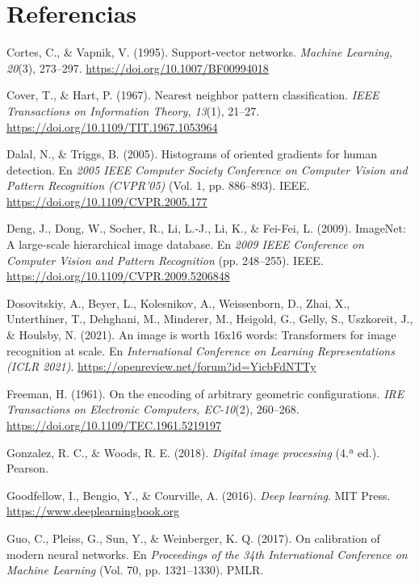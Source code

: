 \documentclass[11pt,letterpaper]{article}
\begin{document}
\clearpage
\section*{Referencias}
\begingroup
\small
\setlength{\parindent}{-1.27cm}
\setlength{\leftskip}{1.27cm}
\setlength{\parskip}{5pt}
\raggedright

Cortes, C., \& Vapnik, V. (1995). Support-vector networks. \emph{Machine Learning, 20}(3), 273--297. \url{https://doi.org/10.1007/BF00994018}

Cover, T., \& Hart, P. (1967). Nearest neighbor pattern classification. \emph{IEEE Transactions on Information Theory, 13}(1), 21--27. \url{https://doi.org/10.1109/TIT.1967.1053964}

Dalal, N., \& Triggs, B. (2005). Histograms of oriented gradients for human detection. En \emph{2005 IEEE Computer Society Conference on Computer Vision and Pattern Recognition (CVPR'05)} (Vol. 1, pp. 886--893). IEEE. \url{https://doi.org/10.1109/CVPR.2005.177}

Deng, J., Dong, W., Socher, R., Li, L.-J., Li, K., \& Fei-Fei, L. (2009). ImageNet: A large-scale hierarchical image database. En \emph{2009 IEEE Conference on Computer Vision and Pattern Recognition} (pp. 248--255). IEEE. \url{https://doi.org/10.1109/CVPR.2009.5206848}

Dosovitskiy, A., Beyer, L., Kolesnikov, A., Weissenborn, D., Zhai, X., Unterthiner, T., Dehghani, M., Minderer, M., Heigold, G., Gelly, S., Uszkoreit, J., \& Houlsby, N. (2021). An image is worth 16x16 words: Transformers for image recognition at scale. En \emph{International Conference on Learning Representations (ICLR 2021)}. \url{https://openreview.net/forum?id=YicbFdNTTy}

Freeman, H. (1961). On the encoding of arbitrary geometric configurations. \emph{IRE Transactions on Electronic Computers, EC-10}(2), 260--268. \url{https://doi.org/10.1109/TEC.1961.5219197}

Gonzalez, R. C., \& Woods, R. E. (2018). \emph{Digital image processing} (4.ª ed.). Pearson.

Goodfellow, I., Bengio, Y., \& Courville, A. (2016). \emph{Deep learning}. MIT Press. \url{https://www.deeplearningbook.org}

Guo, C., Pleiss, G., Sun, Y., \& Weinberger, K. Q. (2017). On calibration of modern neural networks. En \emph{Proceedings of the 34th International Conference on Machine Learning} (Vol. 70, pp. 1321--1330). PMLR.
\end{document}

